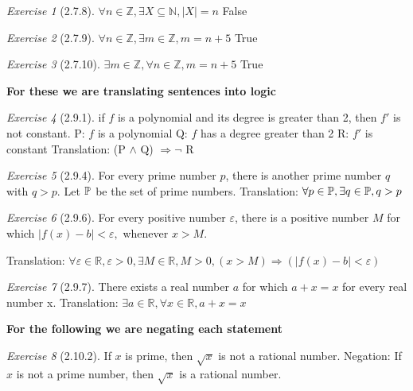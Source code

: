 \documentclass[12pt]{amsart}
\theoremstyle{remark}
\newtheorem*{exercise}{Exercise}%
\newcommand{\RR}{\ensuremath{\mathbb R}} %
\newcommand{\NN}{\ensuremath{\mathbb N}}
\newcommand{\ZZ}{\ensuremath{\mathbb Z}}
\newcommand{\PP}{{\ensuremath\mathbb P}}
\theoremstyle{mycomment}
\begin{document}
\begin{exercise}[2.7.8] $\forall n \in \ZZ, \exists X \subseteq \NN, |X| = n$ \newline
	False
\end{exercise}
\begin{exercise}[2.7.9] $\forall n \in \ZZ, \exists m \in \ZZ, m = n +5$ \newline 
	True
\end{exercise}
\begin{exercise}[2.7.10] $\exists m \in \ZZ, \forall n \in \ZZ, m = n+5$ \newline
True
\end{exercise}
\textbf{For these we are translating sentences into logic}
\begin{exercise}[2.9.1] if $f$ is a polynomial and its degree is greater than 2, then $f'$ is not constant.
	P: $f$ is a polynomial \newline
	Q: $f$ has a degree greater than 2 \newline
	R: $f'$ is constant \newline
	Translation: (P $\land$ Q) $\Rightarrow \neg$ R
\end{exercise}
\begin{exercise}[2.9.4]  For every prime number $p$, there is another prime number $q$ with $q > p.$ \newline
	Let $\PP$ be the set of prime numbers. \newline
	Translation: $\forall p \in \PP, \exists q \in \PP, q > p$  
\end{exercise} \singlespacing
\begin{exercise}[2.9.6] For every positive number $\varepsilon$, there is a positive number $M$ for which \newline $|f(x) - b| < \varepsilon, $ whenever $x > M.$ 

	Translation: $\forall \varepsilon \in \RR, \varepsilon > 0, \exists M \in \RR, M > 0, (x > M) \Rightarrow (|f(x) - b | < \varepsilon)$
\end{exercise}
\begin{exercise}[2.9.7] There exists a real number $a$ for which $a + x = x$ for every real number x.
	Translation: $\exists a \in \RR, \forall x \in \RR, a + x = x$
\end{exercise}
\textbf{For the following we are negating each statement}
\begin{exercise}[2.10.2] If $x$ is prime, then $\sqrt{x}$ is not a rational number. \newline
	Negation: If $x$ is not a prime number, then $\sqrt{x}$ is a rational number.
\end{exercise}
\end{document}
